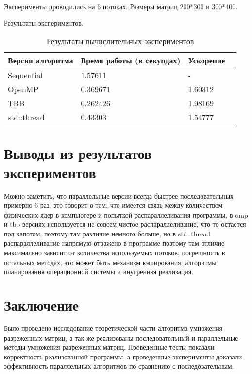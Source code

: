 \documentclass{report}
\begin{document}
\begin{enumerate}
\par Эксперименты проводились на 6 потоках. Размеры матриц 200*300 и 300*400.

\par Результаты экспериментов.
\begin{table}[!h]
\caption{Результаты вычислительных экспериментов}
\centering
\begin{tabular}{| p{2cm} | p{3cm} | p{4cm} | p{2cm} |}
\hline
Версия алгоритма & Время работы (в секундах) & Ускорение  \\[5pt]
\hline
Sequential        & 1.57611        & -         \\
OpenMP        & 0.369671        & 1.60312          \\
TBB       & 0.262426        & 1.98169         \\
std::thread        & 0.43303        & 1.54777           \\

\hline
\end{tabular}
\end{table}

\newpage

\section*{Выводы из результатов экспериментов}
Можно заметить, что параллельные версии всегда быстрее последовательных примерно 6 раз, это говорит о том, что имеется связь между количеством физических ядер в компьютере и попыткой распараллеливания программы, в omp и tbb версиях используется не совсем чистое распараллеливание, что то остается под капотом, поэтому там различие немного больше, но в std::thread распараллеливание напрямую отражено в программе поэтому там отличие максимально зависит от количества используемых потоков, погрешность в остальных методах, это может быть механизм кэширования, алгоритмы планирования операционной системы и внутренняя реализация.
\newpage

\section*{Заключение}
Было проведено исследование теоретической части алгоритма умножения разреженных матриц, а так же реализованы последовательный и параллельные методы умножения разреженных матриц. Проведенные тесты показали корректность реализованной программы, а проведенные эксперименты доказали эффективность параллельных алгоритмов по сравнению с последовательным.
\newpage


\end{enumerate}
\end{document}

